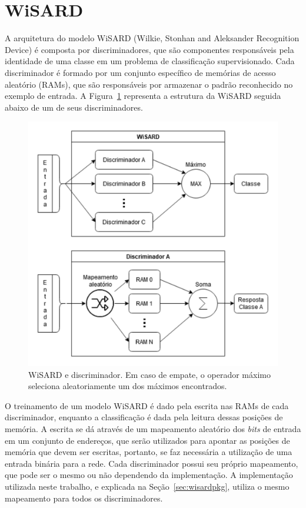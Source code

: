 \section{WiSARD}
A arquitetura do modelo WiSARD (Wilkie, Stonhan and Aleksander Recognition Device) \cite{Aleksander1984WISARDaRS} é composta por discriminadores, que são componentes responsáveis pela identidade de uma classe em um problema de classificação supervisionado. Cada discriminador é formado por um conjunto específico de memórias de acesso aleatório (RAMs), que são responsáveis por armazenar o padrão reconhecido no exemplo de entrada. A Figura~\ref{fig:wsd_disc} representa a estrutura da WiSARD seguida abaixo de um de seus discriminadores.

\begin{figure}[!ht]
    \centering
    \includegraphics[width=5.0in]{img/wisard_discriminator.pdf}
    \caption{WiSARD e discriminador. Em caso de empate, o operador máximo seleciona aleatoriamente um dos máximos encontrados.}
    \label{fig:wsd_disc}
\end{figure}

O treinamento de um modelo WiSARD é dado pela escrita nas RAMs de cada discriminador, enquanto a classificação é dada pela leitura dessas posições de memória. A escrita se dá através de um mapeamento aleatório dos \textit{bits} de entrada em um conjunto de endereços, que serão utilizados para apontar as posições de memória que devem ser escritas, portanto, se faz necessária a utilização de uma entrada binária para a rede. Cada discriminador possui seu próprio mapeamento, que pode ser o mesmo ou não dependendo da implementação. A implementação utilizada neste trabalho, e explicada na Seção~\ref{sec:wisardpkg}, utiliza o mesmo mapeamento para todos os discriminadores.

